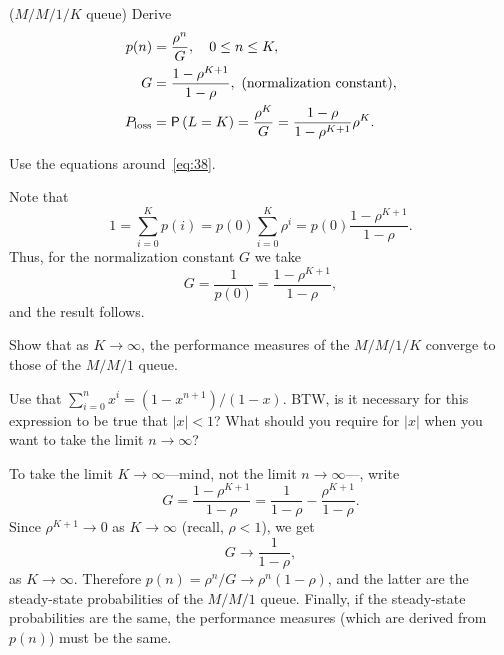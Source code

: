 \begin{exercise} ($M/M/1/K$ queue)
 Derive 
\begin{subequations}\label{eq:8}
 \begin{align}
p(n) &=  \frac{\rho^n}G, \quad 0\leq n \leq K,\\
G &= \frac{1-\rho^{K+1}}{1-\rho}, \text{ (normalization constant)},\\
P_{\text{loss}} &= \P{L=K} = \frac{\rho^K}G = \frac{1-\rho}{1-\rho^{K+1}} \rho^K.
\end{align}
\end{subequations}
\begin{hint}
  Use the equations around~\eqref{eq:38}.
\end{hint}
  \begin{solution}
Note that 
\begin{equation*}
1 = \sum_{i=0}^K p(i) = p(0)\sum_{i=0}^K \rho^i  = p(0) \frac{1-\rho^{K+1}}{1-\rho}. 
\end{equation*}
Thus, for the normalization constant $G$ we take 
\begin{equation*}
G=\frac 1{p(0)} = \frac{1-\rho^{K+1}}{1-\rho},
\end{equation*}
and the result follows. 
  \end{solution}
\end{exercise}

\begin{exercise} 
   Show that as $K\to\infty$, the performance measures of the $M/M/1/K$ converge to those of the $M/M/1$ queue. 
  \begin{hint}
Use that $\sum_{i=0}^n x^i = (1-x^{n+1})/(1-x)$. BTW, is it
    necessary for this expression to be true that $|x|<1$? What should
    you require for $|x|$ when you want to take the limit
    $n\to\infty$?
  \end{hint}
  \begin{solution}
To take the limit $K\to\infty$---mind, not the limit $n\to\infty$---, write
\begin{equation*}
G= \frac{1-\rho^{K+1}}{1-\rho} = \frac{1}{1-\rho} -\frac{\rho^{K+1}}{1-\rho}.
\end{equation*}
Since $\rho^{K+1}\to 0$ as $K\to \infty$ (recall, $\rho<1$),  we get
\begin{equation*}
G \to \frac{1}{1-\rho}, 
\end{equation*}
as $K\to\infty$.  Therefore $p(n)=\rho^n/G \to \rho^n(1-\rho)$, and
the latter are the steady-state probabilities of the $M/M/1$
queue. Finally, if the steady-state probabilities are the same, the
performance measures (which are derived from $p(n)$) must be the same.
  \end{solution}
\end{exercise}


